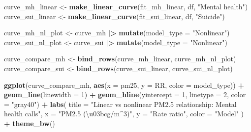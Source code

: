 \documentclass[
]{article}
\newenvironment{Shaded}{\begin{snugshade}}{\end{snugshade}}
\newcommand{\AttributeTok}[1]{\textcolor[rgb]{0.13,0.29,0.53}{#1}}
\newcommand{\DecValTok}[1]{\textcolor[rgb]{0.00,0.00,0.81}{#1}}
\newcommand{\FunctionTok}[1]{\textcolor[rgb]{0.13,0.29,0.53}{\textbf{#1}}}
\newcommand{\NormalTok}[1]{#1}
\newcommand{\OtherTok}[1]{\textcolor[rgb]{0.56,0.35,0.01}{#1}}
\newcommand{\SpecialCharTok}[1]{\textcolor[rgb]{0.81,0.36,0.00}{\textbf{#1}}}
\newcommand{\StringTok}[1]{\textcolor[rgb]{0.31,0.60,0.02}{#1}}
\begin{document}
\begin{Shaded}
\begin{Highlighting}[]
\NormalTok{curve\_mh\_linear  }\OtherTok{\textless{}{-}} \FunctionTok{make\_linear\_curve}\NormalTok{(fit\_mh\_linear, df, }\StringTok{"Mental health"}\NormalTok{)}
\NormalTok{curve\_sui\_linear }\OtherTok{\textless{}{-}} \FunctionTok{make\_linear\_curve}\NormalTok{(fit\_sui\_linear, df, }\StringTok{"Suicide"}\NormalTok{)}

\NormalTok{curve\_mh\_nl\_plot  }\OtherTok{\textless{}{-}}\NormalTok{ curve\_mh  }\SpecialCharTok{|\textgreater{}} \FunctionTok{mutate}\NormalTok{(}\AttributeTok{model\_type =} \StringTok{"Nonlinear"}\NormalTok{)}
\NormalTok{curve\_sui\_nl\_plot }\OtherTok{\textless{}{-}}\NormalTok{ curve\_sui }\SpecialCharTok{|\textgreater{}} \FunctionTok{mutate}\NormalTok{(}\AttributeTok{model\_type =} \StringTok{"Nonlinear"}\NormalTok{)}

\NormalTok{curve\_compare\_mh  }\OtherTok{\textless{}{-}} \FunctionTok{bind\_rows}\NormalTok{(curve\_mh\_linear, curve\_mh\_nl\_plot)}
\NormalTok{curve\_compare\_sui }\OtherTok{\textless{}{-}} \FunctionTok{bind\_rows}\NormalTok{(curve\_sui\_linear, curve\_sui\_nl\_plot)}
\end{Highlighting}
\end{Shaded}

\begin{Shaded}
\begin{Highlighting}[]
\FunctionTok{ggplot}\NormalTok{(curve\_compare\_mh, }\FunctionTok{aes}\NormalTok{(}\AttributeTok{x =}\NormalTok{ pm25, }\AttributeTok{y =}\NormalTok{ RR, }\AttributeTok{color =}\NormalTok{ model\_type)) }\SpecialCharTok{+}
  \FunctionTok{geom\_line}\NormalTok{(}\AttributeTok{linewidth =} \DecValTok{1}\NormalTok{) }\SpecialCharTok{+}
  \FunctionTok{geom\_hline}\NormalTok{(}\AttributeTok{yintercept =} \DecValTok{1}\NormalTok{, }\AttributeTok{linetype =} \DecValTok{2}\NormalTok{, }\AttributeTok{color =} \StringTok{"gray40"}\NormalTok{) }\SpecialCharTok{+}
  \FunctionTok{labs}\NormalTok{(}
    \AttributeTok{title =} \StringTok{"Linear vs nonlinear PM2.5 relationship: Mental health calls"}\NormalTok{,}
    \AttributeTok{x =} \StringTok{"PM2.5 (\textbackslash{}u03bcg/m\^{}3)"}\NormalTok{,}
    \AttributeTok{y =} \StringTok{"Rate ratio"}\NormalTok{,}
    \AttributeTok{color =} \StringTok{"Model"}
\NormalTok{  ) }\SpecialCharTok{+}
  \FunctionTok{theme\_bw}\NormalTok{()}
\end{Highlighting}
\end{Shaded}
\end{document}
